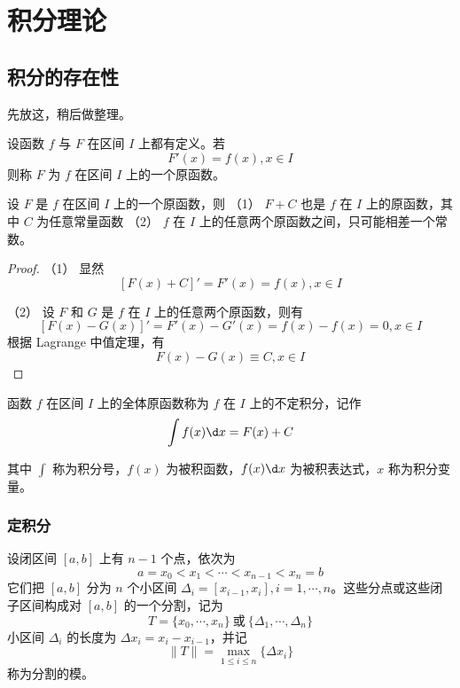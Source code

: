 
\chapter{积分理论}

\section{积分的存在性}

先放这，稍后做整理。

\begin{definition}
    设函数 $f$ 与 $F$ 在区间 $I$ 上都有定义。若
    $$F'(x) = f(x), x\in I$$
    则称 $F$ 为 $f$ 在区间 $I$ 上的一个原函数。
\end{definition}

\begin{theorem}
    设 $F$ 是 $f$ 在区间 $I$ 上的一个原函数，则
    （1） $F+C$ 也是 $f$ 在 $I$ 上的原函数，其中 $C$ 为任意常量函数
    （2） $f$ 在 $I$ 上的任意两个原函数之间，只可能相差一个常数。
\end{theorem}
\begin{proof}
    （1） 显然
    $$\left[ F(x)+C \right]' = F'(x) = f(x), x\in I$$

    （2） 设 $F$ 和 $G$ 是 $f$ 在 $I$ 上的任意两个原函数，则有
    $$\left[ F(x)-G(x) \right]' = F'(x) - G'(x) = f(x) - f(x) = 0, x\in I$$
    根据 Lagrange 中值定理，有
    $$F(x) - G(x) \equiv C, x\in I$$
\end{proof}

\begin{definition}
    函数 $f$ 在区间 $I$ 上的全体原函数称为 $f$ 在 $I$ 上的不定积分，记作
    $$\int f(x) \d x = F(x) + C$$
\end{definition}

其中 $\displaystyle\int$ 称为积分号，$f(x)$ 为被积函数，$f(x)\d x$ 为被积表达式，$x$ 称为积分变量。

\subsection{定积分}

设闭区间 $[a,b]$ 上有 $n-1$ 个点，依次为
$$a = x_0 < x_1 < \cdots < x_{n-1} < x_n = b$$
它们把 $[a,b]$ 分为 $n$ 个小区间 $\Delta_i = [x_{i-1},x_i], i=1,\cdots,n$。这些分点或这些闭子区间构成对 $[a,b]$ 的一个分割，记为
$$T=\{x_0,\cdots,x_n\}\ \text{或}\ \{\Delta_1,\cdots,\Delta_n\}$$
小区间 $\Delta_i$ 的长度为 $\Delta x_i = x_i-x_{i-1}$，并记
$$\| T \| = \max_{1 \leqslant i \leqslant n}\{\Delta x_i\}$$
称为分割的模。

